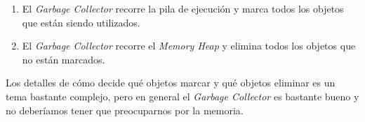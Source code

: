   \begin{enumerate}
    \item El \textit{Garbage Collector} recorre la pila de ejecución y marca todos los objetos que
      están siendo utilizados.
    \item El \textit{Garbage Collector} recorre el \textit{Memory Heap} y elimina todos los objetos
      que no están marcados.
  \end{enumerate}

  Los detalles de cómo decide qué objetos marcar y qué objetos eliminar es un tema bastante
  complejo, pero en general el \textit{Garbage Collector} es bastante bueno y no deberíamos tener
  que preocuparnos por la memoria.

  